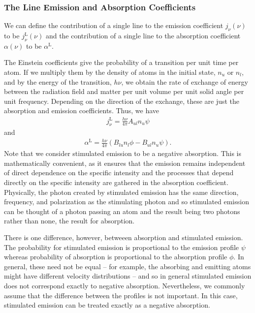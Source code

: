 \subsubsection{The Line Emission and Absorption Coefficients}

We can define the contribution of a single line to the
emission coefficient $j_\nu(\nu)$ to be
$j_\nu^\mathrm{L}(\nu)$ and the contribution of a single
line to the absorption coefficient $\alpha(\nu)$ to be
$\alpha^\mathrm{L}$.

The Einstein coefficients give the probability of a transition per unit
time per atom. If we multiply them by the density of atoms in the
initial state, $n_u$ or $n_l$, and by the energy of the transition,
$h\nu$, we obtain the rate of exchange of energy between the radiation
field and matter per unit volume per unit solid angle per unit
frequency. Depending on the direction of the exchange, these are just
the absorption and emission coefficients. Thus, we have
\begin{align}
j_\nu^\mathrm{L} = \frac{h\nu}{4\pi} A_{ul} n_u \psi
\end{align}
and
\begin{align}
\alpha^\mathrm{L} = \frac{h\nu}{4\pi} (B_{lu} n_l
\phi - B_{ul} n_u\psi).
\end{align}
Note that we consider stimulated emission to be a negative
absorption. This is mathematically convenient, as it ensures
that the emission remains independent of direct dependence
on the specific intensity and the processes that depend
directly on the specific intensity are gathered in the
absorption coefficient. Physically, the photon created by
stimulated emission has the same direction, frequency, and
polarization as the stimulating photon and so stimulated
emission can be thought of a photon passing an atom and the
result being two photons rather than none, the result for
absorption.

There is one difference, however, betweeen absorption and
stimulated emission. The probability for stimulated emission
is proportional to the emission profile $\psi$ whereas
probability of absorption is proportional to the absorption
profile $\phi$. In general, these need not be equal --
for example, the absorbing and emitting atoms might have
different velocity distributions -- and so in general
stimulated emission does not correspond exactly to negative
absorption. Nevertheless, we commonly assume that the
difference between the profiles is not important. In this
case, stimulated emission can be treated exactly as a
negative absorption.

